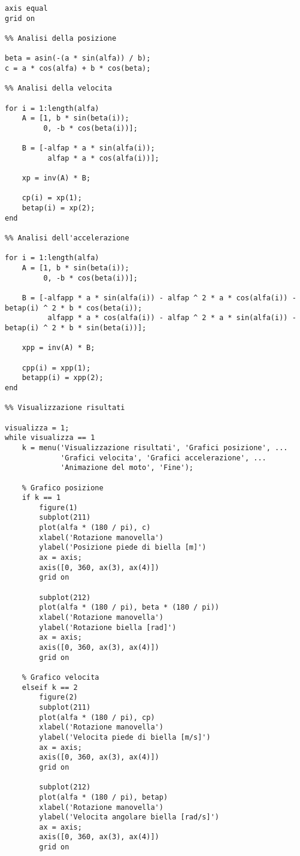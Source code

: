 \documentclass{article}
\begin{document}
\begin{lstlisting}[basicstyle=\footnotesize]
axis equal
grid on

%% Analisi della posizione

beta = asin(-(a * sin(alfa)) / b);
c = a * cos(alfa) + b * cos(beta);

%% Analisi della velocita

for i = 1:length(alfa)
    A = [1, b * sin(beta(i));
         0, -b * cos(beta(i))];

    B = [-alfap * a * sin(alfa(i));
          alfap * a * cos(alfa(i))];

    xp = inv(A) * B;

    cp(i) = xp(1);
    betap(i) = xp(2);
end

%% Analisi dell'accelerazione

for i = 1:length(alfa)
    A = [1, b * sin(beta(i));
         0, -b * cos(beta(i))];

    B = [-alfapp * a * sin(alfa(i)) - alfap ^ 2 * a * cos(alfa(i)) - betap(i) ^ 2 * b * cos(beta(i));
          alfapp * a * cos(alfa(i)) - alfap ^ 2 * a * sin(alfa(i)) - betap(i) ^ 2 * b * sin(beta(i))];

    xpp = inv(A) * B;

    cpp(i) = xpp(1);
    betapp(i) = xpp(2);
end

%% Visualizzazione risultati

visualizza = 1;
while visualizza == 1
    k = menu('Visualizzazione risultati', 'Grafici posizione', ...
             'Grafici velocita', 'Grafici accelerazione', ...
             'Animazione del moto', 'Fine');

    % Grafico posizione
    if k == 1
        figure(1)
        subplot(211)
        plot(alfa * (180 / pi), c)
        xlabel('Rotazione manovella')
        ylabel('Posizione piede di biella [m]')
        ax = axis;
        axis([0, 360, ax(3), ax(4)])
        grid on

        subplot(212)
        plot(alfa * (180 / pi), beta * (180 / pi))
        xlabel('Rotazione manovella')
        ylabel('Rotazione biella [rad]')
        ax = axis;
        axis([0, 360, ax(3), ax(4)])
        grid on

    % Grafico velocita
    elseif k == 2
        figure(2)
        subplot(211)
        plot(alfa * (180 / pi), cp)
        xlabel('Rotazione manovella')
        ylabel('Velocita piede di biella [m/s]')
        ax = axis;
        axis([0, 360, ax(3), ax(4)])
        grid on 

        subplot(212)
        plot(alfa * (180 / pi), betap)
        xlabel('Rotazione manovella')
        ylabel('Velocita angolare biella [rad/s]')
        ax = axis;
        axis([0, 360, ax(3), ax(4)])
        grid on


\end{lstlisting}
\end{document}
